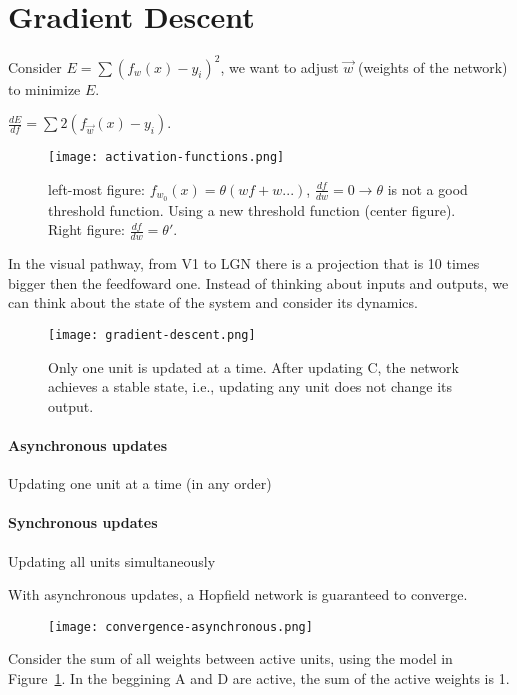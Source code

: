 \documentclass[main]{subfiles}
\begin{document}

\section{Gradient Descent}
Consider $E = \sum(f_w(x) - y_i)^2$, we want to adjust $\vec{w}$ (weights of the network) to minimize $E$.

$\frac{dE}{df} = \sum 2(f_{\vec{w}} (x) - y_i)$.

\begin{figure}[H]
	\centering
	\texttt{[image: activation-functions.png]}
	\caption{left-most figure: $f_{w_0} (x) = \theta(wf + w...)$, $\frac{df}{dw} = 0 \rightarrow \theta$ is not a good threshold function. Using a new threshold function (center figure). Right figure: $\frac{df}{dw} = \theta\prime$.}
\end{figure}

In the visual pathway, from V1 to LGN there is a projection that is 10 times bigger then the feedfoward one. Instead of thinking about inputs and outputs, we can think about the state of the system and consider its dynamics.

\begin{figure}[H]
	\centering
	\texttt{[image: gradient-descent.png]}
	\label{fig:gradient-descent}
	\caption{Only one unit is updated at a time. After updating C, the network achieves a stable state, i.e., updating any unit does not change its output.}
\end{figure}

\paragraph{Asynchronous updates} 
Updating one unit at a time (in any order)
\paragraph{Synchronous updates}
Updating all units simultaneously

With asynchronous updates, a Hopfield network is guaranteed to converge.

\begin{figure}[H]
	\centering
	\texttt{[image: convergence-asynchronous.png]}
\end{figure}

Consider the sum of all weights between active units, using the model in Figure~\ref{fig:gradient-descent}. In the beggining A and D are active, the sum of the active weights is 1.
\end{document}
